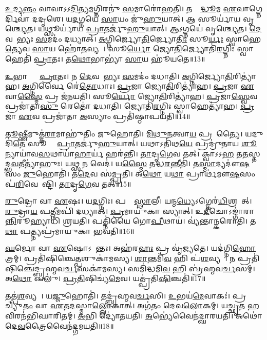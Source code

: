 \ul{𑌉}𑌦𑍍𑌯\ul{𑌨𑍍𑌤𑌂} 𑌵𑌾𑌵𑌾\-𑌽𑌽\ul{𑌦𑌿}𑌤𑍍𑌯\ul{𑌮}𑌗𑍍𑌨𑌿𑌰𑌨𑍁॑ \ul{𑌸}𑌮𑌾𑌰𑍋॑𑌹𑌤𑌿।
𑌤𑌸𑍍𑌮𑌾᳚\ul{𑌦𑍍𑌧𑍂}𑌮 \ul{𑌏}𑌵𑌾𑌗𑍍𑌨𑍇𑌰𑍍𑌦𑌿𑌵𑌾॑ 𑌦𑌦𑍃𑌶𑍇।
𑌯\ul{𑌦}𑌗𑍍𑌨𑌯𑍇॑ \ul{𑌸𑌾}𑌯𑌂 𑌜𑍁॑\ul{𑌹𑍁}𑌯𑌾𑌤𑍍।
𑌆 𑌸𑍂𑌰𑍍𑌯𑌾॑𑌯 𑌵𑍃𑌶𑍍𑌚𑍍𑌯𑍇𑌤।
𑌯𑌥𑍍𑌸𑍂𑌰𑍍𑌯𑌾॑𑌯 \ul{𑌪𑍍𑌰𑌾}𑌤𑌰𑍍𑌜𑍁॑\ul{𑌹𑍁}𑌯𑌾𑌤𑍍।
𑌆𑌽𑌗𑍍𑌨𑌯𑍇॑ 𑌵𑍃𑌶𑍍𑌚𑍍𑌯𑍇𑌤।
\ul{𑌦𑍇}𑌵𑌤𑌾᳚𑌭𑍍𑌯𑌃 \ul{𑌸}𑌮𑌦𑌂॑ 𑌦𑌧𑍍𑌯𑌾𑌤𑍍।
\ul{𑌅}𑌗𑍍𑌨𑌿𑌰𑍍𑌜𑍍𑌯𑍋\ul{𑌤𑌿}𑌰𑍍𑌜𑍍𑌯𑍋\ul{𑌤𑌿𑌃} 𑌸𑍂\ul{𑌰𑍍𑌯𑌃} 𑌸𑍍𑌵𑌾𑌹𑍇\ul{𑌤𑍍𑌯𑍇}𑌵 \ul{𑌸𑌾}𑌯 𑌹𑍋॑\ul{𑌤}𑌵𑍍𑌯𑌮𑍍᳚।
𑌸𑍂\ul{𑌰𑍍𑌯𑍋} 𑌜𑍍𑌯𑍋\ul{𑌤𑌿}𑌰𑍍𑌜𑍍𑌯𑍋𑌤𑌿॑\ul{𑌰}𑌗𑍍𑌨𑌿𑌃 𑌸𑍍𑌵𑌾𑌹𑍇𑌤𑌿॑ \ul{𑌪𑍍𑌰𑌾}𑌤𑌃।
𑌤\ul{𑌥𑍋}𑌭𑌾𑌭𑍍𑌯𑌾॑ \ul{𑌸𑌾}𑌯 𑌹𑍂॑𑌯𑌤𑍇॥13॥

\ul{𑌉}𑌭𑌾𑌭𑍍𑌯𑌾𑌂᳚ \ul{𑌪𑍍𑌰𑌾}𑌤𑌃।
𑌨 \ul{𑌦𑍇}𑌵𑌤𑌾᳚𑌭𑍍𑌯𑌃 \ul{𑌸}𑌮𑌦𑌂॑ 𑌦𑌧𑌾𑌤𑌿।
\ul{𑌅}𑌗𑍍𑌨𑌿𑌰𑍍𑌜𑍍𑌯𑍋\ul{𑌤𑌿}\-𑌰𑌿𑌤𑍍𑌯𑌾॑𑌹।
\ul{𑌅}𑌗𑍍𑌨𑌿𑌰𑍍𑌵𑍈 𑌰𑍇॑\ul{𑌤𑍋}𑌧𑌾𑌃।
\ul{𑌪𑍍𑌰}𑌜𑌾 𑌜𑍍𑌯𑍋\ul{𑌤𑌿}𑌰𑌿𑌤𑍍𑌯𑌾॑𑌹।
\ul{𑌪𑍍𑌰}𑌜𑌾 \ul{𑌏}𑌵𑌾\ul{𑌸𑍍𑌮𑍈} 𑌪𑍍𑌰 𑌜॑𑌨𑌯𑌤𑌿।
𑌸𑍂\ul{𑌰𑍍𑌯𑍋} 𑌜𑍍𑌯𑍋\ul{𑌤𑌿}𑌰𑌿𑌤𑍍𑌯𑌾॑𑌹।
\ul{𑌪𑍍𑌰}𑌜𑌾\ul{𑌸𑍍𑌵𑍇}𑌵 𑌪𑍍𑌰𑌜𑌾॑𑌤𑌾\ul{𑌸𑍁} 𑌰𑍇𑌤𑍋॑ 𑌦𑌧𑌾𑌤𑌿।
𑌜𑍍𑌯𑍋𑌤𑌿॑\ul{𑌰}𑌗𑍍𑌨𑌿𑌃 𑌸𑍍𑌵𑌾𑌹𑍇𑌤𑍍𑌯𑌾॑𑌹।
\ul{𑌪𑍍𑌰}𑌜𑌾 \ul{𑌏}𑌵 𑌪𑍍𑌰𑌜𑌾॑𑌤𑌾 \ul{𑌅}𑌸𑍍𑌯𑌾𑌂 𑌪𑍍𑌰𑌤𑌿॑\-𑌷𑍍𑌠𑌾𑌪𑌯𑌤𑌿॥14॥

\ul{𑌤𑍂}𑌷𑍍𑌣𑍀𑌮𑍁𑌤𑍍𑌤॑\ul{𑌰𑌾}𑌮𑌾𑌹𑍁॑𑌤𑌿𑌂 𑌜𑍁𑌹𑍋𑌤𑌿।
\ul{𑌮𑌿}\ul{𑌥𑍁}\ul{𑌨}𑌤𑍍𑌵𑌾\ul{𑌯} 𑌪𑍍𑌰𑌜𑌾᳚𑌤𑍍𑌯𑍈।
𑌯𑌦𑍁𑌦𑌿॑\ul{𑌤𑍇} 𑌸𑍂𑌰𑍍𑌯𑍇᳚ \ul{𑌪𑍍𑌰𑌾}𑌤𑌰𑍍𑌜𑍁॑\ul{𑌹𑍁}𑌯𑌾𑌤𑍍।
𑌯𑌥𑌾𑌽𑌤𑌿॑𑌥\ul{𑌯𑍇} 𑌪𑍍𑌰𑌦𑍍𑌰𑍁॑𑌤𑌾𑌯 \ul{𑌶𑍂}𑌨𑍍𑌯𑌾𑌯𑌾॑𑌵\ul{𑌸}𑌥𑌾𑌯𑌾॑\ul{𑌹𑌾}𑌰𑍍𑌯॑ 𑌹𑌰॑𑌨𑍍𑌤𑌿।
\ul{𑌤𑌾}𑌦𑍃\ul{𑌗𑍇}𑌵 𑌤𑌤𑍍।
𑌕𑍍𑌵𑌾𑌽𑌽\ul{𑌹} 𑌤\ul{𑌤}𑌸𑍍𑌤𑌦𑍍𑌭\ul{𑌵}𑌤𑍀𑌤𑍍𑌯𑌾॑𑌹𑍁𑌃।
𑌯𑌥𑍍𑌸 𑌨 𑌵𑍇𑌦॑।
𑌯\ul{𑌸𑍍𑌮𑍈} 𑌤𑌦𑍍𑌧\ul{𑌰}𑌨𑍍𑌤𑍀𑌤𑌿॑।
𑌤\ul{𑌸𑍍𑌮𑌾}𑌦𑍍𑌯𑌦𑍗॑\ul{𑌷}𑌸𑌂 \ul{𑌜𑍁}𑌹𑍋𑌤𑌿॑।
𑌤\ul{𑌦𑍇}𑌵 𑌸॑\ul{𑌮𑍍𑌪𑍍𑌰}𑌤𑌿।
𑌅\ul{𑌥𑍋} 𑌯\ul{𑌥𑌾} 𑌪𑍍𑌰𑌾𑌰𑍍𑌥॑𑌮𑍗\ul{𑌷}𑌸𑌂 𑌪॑\ul{𑌰𑌿}𑌵𑍇𑌵𑍇᳚𑌷𑍍𑌟𑌿।
\ul{𑌤𑌾}𑌦𑍃\ul{𑌗𑍇}𑌵 𑌤𑌤𑍍॥15॥

\ul{𑌰𑍁}𑌦𑍍𑌰𑍋 𑌵𑌾 \ul{𑌏}𑌷𑌃।
𑌯\ul{𑌦}𑌗𑍍𑌨𑌿𑌃।
𑌪𑌤𑍍𑌨𑍀᳚ \ul{𑌸𑍍𑌥𑌾}𑌲𑍀।
𑌯𑌨𑍍𑌮\ul{𑌧𑍍𑌯𑍇}\-𑌽𑌗𑍍𑌨𑍇𑌰॑\ul{𑌧𑌿}𑌶𑍍𑌰𑌯𑍇᳚𑌤𑍍।
\ul{𑌰𑍁}𑌦𑍍𑌰𑌾\ul{𑌯} 𑌪\ul{𑌤𑍍𑌨𑍀}𑌮𑌪𑌿॑ 𑌦𑌧𑍍𑌯𑌾𑌤𑍍।
\ul{𑌪𑍍𑌰}𑌮𑌾𑌯𑍁॑𑌕𑌾 𑌸𑍍𑌯𑌾𑌤𑍍।
𑌉\ul{𑌦𑍀}𑌚𑍋\-𑌽𑌙𑍍𑌗𑌾॑𑌰𑌾\ul{𑌨𑍍𑌨𑌿}𑌰𑍂𑌹𑍍𑌯𑌾𑌧𑌿॑ 𑌶𑍍𑌰𑌯𑌤𑌿।
𑌪𑌤𑍍𑌨𑌿॑𑌯𑍈 𑌗𑍋\ul{𑌪𑍀}𑌥𑌾𑌯॑।
𑌵𑍍𑌯॑𑌨𑍍𑌤𑌾𑌨𑍍𑌕𑌰𑍋𑌤𑌿।
𑌤\ul{𑌥𑌾} 𑌪𑌤𑍍𑌨𑍍𑌯𑌪𑍍𑌰॑𑌮𑌾𑌯𑍁𑌕𑌾 𑌭𑌵𑌤𑌿॥16॥

\ul{𑌘}𑌰𑍍𑌮𑍋 𑌵𑌾 \ul{𑌏}𑌷𑍋\-𑌽𑌶𑌾᳚𑌨𑍍𑌤𑌃।
𑌅𑌹॑𑌰\ul{𑌹𑌃} 𑌪𑍍𑌰 𑌵𑍃॑𑌜𑍍𑌯𑌤𑍇।
𑌯𑌦॑𑌗𑍍𑌨𑌿\ul{𑌹𑍋}𑌤𑍍𑌰𑌮𑍍।
𑌪𑍍𑌰𑌤𑌿॑\-𑌷𑌿𑌞𑍍𑌚𑍇\ul{𑌤𑍍𑌪}𑌶𑍁𑌕𑌾॑𑌮𑌸𑍍𑌯।
\ul{𑌶𑌾}𑌨𑍍𑌤𑌮𑌿॑\ul{𑌵} 𑌹𑌿 𑌪॑\ul{𑌶}𑌵𑍍𑌯𑌮𑍍᳚।
𑌨 𑌪𑍍𑌰𑌤𑌿॑\-𑌷𑌿𑌞𑍍𑌚𑍇𑌦𑍍𑌬𑍍𑌰𑌹𑍍𑌮𑌵\ul{𑌰𑍍𑌚}𑌸𑌕𑌾॑𑌮𑌸𑍍𑌯।
𑌸𑌮𑌿॑𑌦𑍍𑌧𑌮𑌿\ul{𑌵} 𑌹𑌿 𑌬𑍍𑌰॑𑌹𑍍𑌮𑌵\ul{𑌰𑍍𑌚}𑌸𑌮𑍍।
𑌅\ul{𑌥𑍋} 𑌖𑌲𑍁॑।
\ul{𑌪𑍍𑌰}\ul{𑌤𑌿}𑌷𑌿𑌚𑍍𑌯॑\ul{𑌮𑍇}𑌵।
𑌯𑌤𑍍𑌪𑍍𑌰॑𑌤𑌿\ul{𑌷𑌿}𑌞𑍍𑌚𑌤𑌿॑॥17॥

𑌤𑌤𑍍𑌪॑\ul{𑌶}𑌵𑍍𑌯𑌮𑍍᳚।
𑌯\ul{𑌜𑍍𑌜𑍁}𑌹𑍋𑌤𑌿॑।
𑌤𑌦𑍍𑌬𑍍𑌰॑𑌹𑍍𑌮𑌵\ul{𑌰𑍍𑌚}𑌸𑌿।
\ul{𑌉}𑌭𑌯॑\ul{𑌮𑍇}𑌵𑌾𑌕𑌃॑।
𑌪𑍍𑌰𑌚𑍍𑌯𑍁॑\ul{𑌤𑌂} 𑌵𑌾 \ul{𑌏}𑌤\ul{𑌦}𑌸𑍍𑌮𑌾\ul{𑌲𑍍𑌲𑍋}𑌕𑌾𑌤𑍍।
𑌅𑌗॑𑌤𑌂 𑌦𑍇𑌵\ul{𑌲𑍋}𑌕𑌮𑍍।
𑌯\ul{𑌚𑍍𑌛𑍃}𑌤 \ul{𑌹}𑌵𑌿𑌰𑌨॑𑌭𑌿𑌘𑌾𑌰𑌿𑌤𑌮𑍍।
\ul{𑌅}𑌭𑌿 𑌦𑍍𑌯𑍋॑𑌤𑌯𑌤𑌿।
\ul{𑌅}𑌭𑍍𑌯𑍇॑𑌵𑍈𑌨॑𑌦𑍍\mbox{}𑌘𑌾𑌰𑌯𑌤𑌿।
𑌅𑌥𑍋॑ 𑌦𑍇\ul{𑌵}𑌤𑍍𑌰𑍈𑌵𑍈𑌨॑𑌦𑍍𑌗𑌮𑌯𑌤𑌿॥18॥

